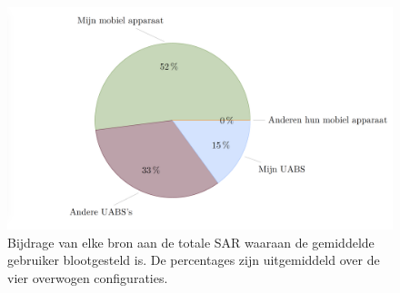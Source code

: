 \documentclass[twocolumn]{phdsymp_dutch}
\begin{document}
\begin{figure}[hb!]
\centering
  \includegraphics[width=\linewidth]{pie.png}
\caption{
  Bijdrage van elke bron aan de totale SAR waaraan de gemiddelde gebruiker blootgesteld is. 
  De percentages zijn uitgemiddeld over de vier overwogen configuraties.}
\label{fig:pie}
\end{figure}
\end{document}
